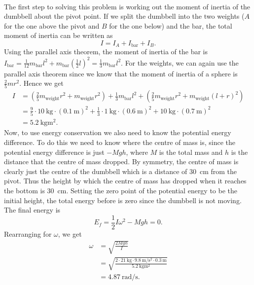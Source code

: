 \documentclass[../classical_mechanics.tex]{subfiles}
\begin{document}
\begin{example}
            \paragraph{}
            The first step to solving this problem is working out the moment of inertia of the dumbbell about the pivot point.
            If we split the dumbbell into the two weights ($A$ for the one above the pivot and $B$ for the one below) and the bar, the total moment of inertia can be written as
            \begin{equation}
                I=I_A+I_\text{bar}+I_B.
            \end{equation}
            Using the parallel axis theorem, the moment of inertia of the bar is $I_\text{bar}=\frac{1}{12}m_\text{bar}l^2+m_\text{bar}\left(\frac{1}{2}l\right)^2=\frac{1}{3}m_\text{bar}l^2$.
            For the weights, we can again use the parallel axis theorem since we know that the moment of inertia of a sphere is $\frac{2}{5}mr^2$.
            Hence we get
            \begin{align}
                I&=\left(\frac{2}{5}m_\text{weight}r^2+m_\text{weight}r^2\right)+\frac{1}{3}m_\text{bar}l^2+\left(\frac{2}{5}m_\text{weight}r^2+m_\text{weight}(l+r)^2\right)\\
                &=\frac{9}{5}\cdot\qty{10}{\kilogram}\cdot(\qty{0.1}{\meter})^2+\frac{1}{3}\cdot\qty{1}{\kilogram}\cdot(\qty{0.6}{\meter})^2+\qty{10}{\kilogram}\cdot(\qty{0.7}{\meter})^2\\
                &=\qty{5.2}{\kilogram\meter\squared}.
            \end{align}
            Now, to use energy conservation we also need to know the potential energy difference.
            To do this we need to know where the centre of mass is, since the potential energy difference is just $-Mgh$, where $M$ is the total mass and $h$ is the distance that the centre of mass dropped.
            By symmetry, the centre of mass is clearly just the centre of the dumbbell which is a distance of \qty{30}{\centi\meter} from the pivot.
            Thus the height by which the centre of mass has dropped when it reaches the bottom is \qty{30}{\centi\meter}.
            Setting the zero point of the potential energy to be the initial height, the total energy before is zero since the dumbbell is not moving.
            The final energy is
            \begin{equation}
                E_f=\frac{1}{2}I\omega^2-Mgh=0.
            \end{equation}
            Rearranging for $\omega$, we get
            \begin{align}
                \omega&=\sqrt{\frac{2Mgh}{I}}\\
                &=\sqrt{\frac{2\cdot\qty{21}{\kilogram}\cdot\qty{9.8}{\meter\per\second\squared}\cdot\qty{0.3}{\meter}}{\qty{5.2}{\kilogram\meter\squared}}}\\
                &=\qty{4.87}{\radian\per\second}.
            \end{align}
        \end{example}
\end{document}
